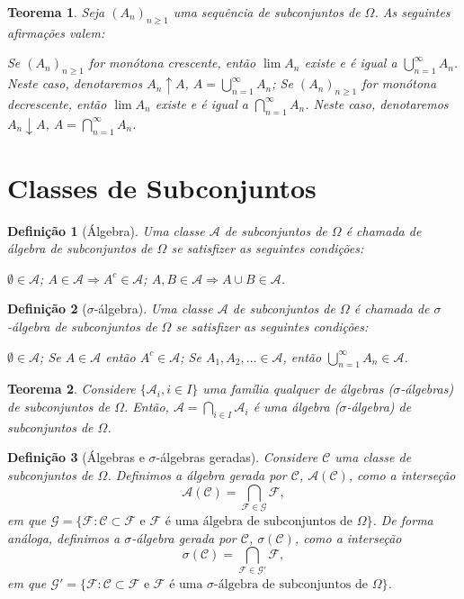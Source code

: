 \documentclass[12pt,a4paper,answers]{article}
\numberwithin{equation}{section} %
\newcommand{\Acal}{\mathcal{A}}
\newcommand{\Ccal}{\mathcal{C}}
\newcommand{\Fcal}{\mathcal{F}}
\newcommand{\Gcal}{\mathcal{G}}
\theoremstyle{thm_estilo}
\newtheorem{theorem}{Teorema}[section]
\newtheorem{definition}{Definição}[section]
\theoremstyle{thm_note_est}
\begin{document}
\begin{theorem}
	Seja $(A_n)_{n\geq 1}$ uma sequência de subconjuntos de $\Omega$. As seguintes afirmações valem:
	\begin{outline}[enumerate]
		\1 Se $(A_n)_{n\geq 1}$ for monótona crescente, então $\lim A_n$ existe e é igual a $\bigcup_{n=1}^{\infty} A_n$. Neste caso, denotaremos $A_n \uparrow A$, $A = \bigcup_{n=1}^{\infty} A_n$;
		\1 Se $(A_n)_{n\geq 1}$ for monótona decrescente, então $\lim A_n$ existe e é igual a $\bigcap_{n=1}^{\infty} A_n$. Neste caso, denotaremos $A_n \downarrow A$, $A = \bigcap_{n=1}^{\infty} A_n$.
	\end{outline}
\end{theorem}

\section{Classes de Subconjuntos}

\begin{definition}[Álgebra]
	Uma classe $\Acal$ de subconjuntos de $\Omega$ é chamada de álgebra de subconjuntos de $\Omega$ se satisfizer as seguintes condições:
	\begin{outline}[enumerate]
		\1 $\emptyset \in \Acal$;
		\1 $A \in \Acal \Rightarrow A^c \in \Acal$;
		\1 $A, B \in \Acal \Rightarrow A \cup B \in \Acal$.
	\end{outline}
\end{definition}

\begin{definition}[$\sigma$-álgebra]
	Uma classe $\Acal$ de subconjuntos de $\Omega$ é chamada de $\sigma$-álgebra de subconjuntos de $\Omega$ se satisfizer as seguintes condições:
	\begin{outline}[enumerate]
		\1 $\emptyset \in \Acal$;
		\1 Se $A \in \Acal$ então $A^c \in \Acal$;
		\1 Se $A_1, A_2, \ldots \in \Acal$, então $\bigcup_{n=1}^{\infty} A_n \in \Acal$.
	\end{outline}
\end{definition}

\begin{theorem}
	Considere $\{\Acal_i, i \in I\}$ uma família qualquer de álgebras ($\sigma$-álgebras) de subconjuntos de $\Omega$. Então, $\Acal = \bigcap_{i \in I} \Acal_i$ é uma álgebra ($\sigma$-álgebra) de subconjuntos de $\Omega$.
\end{theorem}

\begin{definition}[Álgebras e $\sigma$-álgebras geradas]
	Considere $\Ccal$ uma classe de subconjuntos de $\Omega$. Definimos a álgebra gerada por $\Ccal$, $\Acal(\Ccal)$, como a interseção
	\[
	\Acal(\Ccal) = \bigcap_{\Fcal \in \Gcal} \Fcal,
	\]
	em que $\Gcal = \{\Fcal : \Ccal \subset \Fcal \text{ e } \Fcal \text{ é uma álgebra de subconjuntos de } \Omega\}$. De forma análoga, definimos a $\sigma$-álgebra gerada por $\Ccal$, $\sigma(\Ccal)$, como a interseção
	\[
	\sigma(\Ccal) = \bigcap_{\Fcal \in \Gcal'} \Fcal,
	\]
	em que $\Gcal' = \{\Fcal : \Ccal \subset \Fcal \text{ e } \Fcal \text{ é uma } \sigma\text{-álgebra de subconjuntos de } \Omega\}$.
\end{definition}
\end{document}

